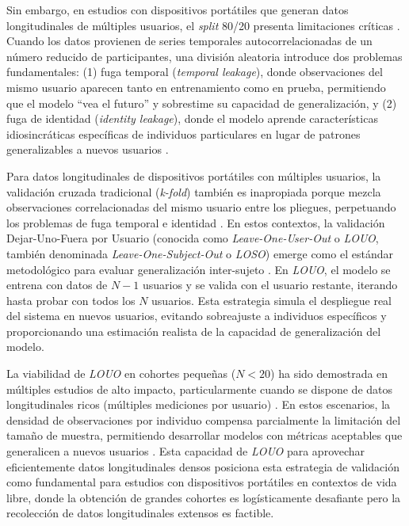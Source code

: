Sin embargo, en estudios con dispositivos portátiles que generan datos longitudinales de múltiples usuarios, el \textit{split} 80/20 presenta limitaciones críticas \cite{Rehman2024LOSO,Mathew2024LOSO}. Cuando los datos provienen de series temporales autocorrelacionadas de un número reducido de participantes, una división aleatoria introduce dos problemas fundamentales: (1) fuga temporal (\textit{temporal leakage}), donde observaciones del mismo usuario aparecen tanto en entrenamiento como en prueba, permitiendo que el modelo ``vea el futuro'' y sobrestime su capacidad de generalización, y (2) fuga de identidad (\textit{identity leakage}), donde el modelo aprende características idiosincráticas específicas de individuos particulares en lugar de patrones generalizables a nuevos usuarios \cite{Rehman2024LOSO}.

Para datos longitudinales de dispositivos portátiles con múltiples usuarios, la validación cruzada tradicional (\textit{k-fold}) también es inapropiada porque mezcla observaciones correlacionadas del mismo usuario entre los pliegues, perpetuando los problemas de fuga temporal e identidad \cite{Rehman2024LOSO}. En estos contextos, la validación Dejar-Uno-Fuera por Usuario (conocida como \textit{Leave-One-User-Out} o \textit{LOUO}, también denominada \textit{Leave-One-Subject-Out} o \textit{LOSO}) emerge como el estándar metodológico para evaluar generalización inter-sujeto \cite{Ji2023Scratch,Rehman2024LOSO}. En \textit{LOUO}, el modelo se entrena con datos de $N-1$ usuarios y se valida con el usuario restante, iterando hasta probar con todos los $N$ usuarios. Esta estrategia simula el despliegue real del sistema en nuevos usuarios, evitando sobreajuste a individuos específicos y proporcionando una estimación realista de la capacidad de generalización del modelo.

La viabilidad de \textit{LOUO} en cohortes pequeñas ($N < 20$) ha sido demostrada en múltiples estudios de alto impacto, particularmente cuando se dispone de datos longitudinales ricos (múltiples mediciones por usuario) \cite{Bolger2013,Ji2023Scratch}. En estos escenarios, la densidad de observaciones por individuo compensa parcialmente la limitación del tamaño de muestra, permitiendo desarrollar modelos con métricas aceptables que generalicen a nuevos usuarios \cite{Mathew2024LOSO}. Esta capacidad de \textit{LOUO} para aprovechar eficientemente datos longitudinales densos posiciona esta estrategia de validación como fundamental para estudios con dispositivos portátiles en contextos de vida libre, donde la obtención de grandes cohortes es logísticamente desafiante pero la recolección de datos longitudinales extensos es factible.

